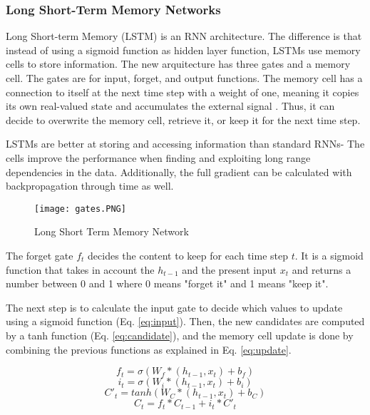 \subsubsection{Long Short-Term Memory Networks}
Long Short-term Memory (LSTM) is an RNN architecture. The difference is that instead of using a sigmoid function as hidden layer function, LSTMs use memory cells to store information. The new arquitecture has three gates and a memory cell. The gates are for input, forget, and output functions. The memory cell has a connection to itself at the next time step with a weight of one, meaning it copies its own real-valued state and accumulates the external signal \cite{lecun2015deep}. Thus, it can decide to overwrite the memory cell, retrieve it, or keep it for the next time step\cite{zaremba2014recurrent}. 

LSTMs are better at storing and accessing information than standard RNNs- The cells improve the performance when finding and exploiting long range dependencies in the data. Additionally, the full gradient can be calculated with backpropagation through time as well.\cite{graves2013generating}

\begin{figure}
\label{fig:lstm}
\center
\texttt{[image: gates.PNG]}
\caption{Long Short Term Memory Network}
\end{figure}

The forget gate $f_t$ decides the content to keep for each time step $t$. It is a sigmoid function that takes in account the $h_{t-1}$ and the present input $x_t$ and returns a number between 0 and 1 where 0 means "forget it" and 1 means "keep it". 

The next step is to calculate the input gate to decide which values to update using a sigmoid function (Eq. \ref{eq:input}). Then, the new candidates are computed by a tanh function (Eq. \ref{eq:candidate}), and the memory cell update is done by combining the previous functions as explained in Eq. \ref{eq:update}.

\begin{equation} \label{eq:forget}
f_t=\sigma(W_f*(h_{t-1},x_t)+b_f)
\end{equation}
\begin{equation} \label{eq:input}
i_t=\sigma(W_i*(h_{t-1},x_t)+b_i)
\end{equation}
\begin{equation} \label{eq:candidate}
C'_t=tanh(W_C*(h_{t-1},x_t)+b_C)
\end{equation}
\begin{equation} \label{eq:update}
C_t=f_t*C_{t-1}+i_t*C'_t
\end{equation}

